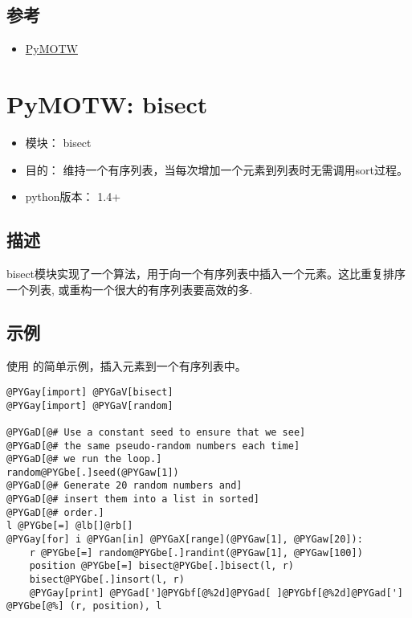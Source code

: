\documentclass[a4paper,10pt,english]{manual}
\begin{document}
\section{参考}
\begin{itemize}
\item {} 
\href{http://http://tc-nsop-test2.tc.baidu.com:3129/documents}{PyMOTW}

\end{itemize}

\resetcurrentobjects


\chapter{PyMOTW: bisect}
\begin{itemize}
\item {} 
模块： bisect

\item {} 
目的： 维持一个有序列表，当每次增加一个元素到列表时无需调用sort过程。

\item {} 
python版本： 1.4+

\end{itemize}


\section{描述}

bisect模块实现了一个算法，用于向一个有序列表中插入一个元素。这比重复排序一个列表, 或重构一个很大的有序列表要高效的多.


\section{示例}

使用  的简单示例，插入元素到一个有序列表中。

\begin{Verbatim}[commandchars=@\[\]]
@PYGay[import] @PYGaV[bisect]
@PYGay[import] @PYGaV[random]

@PYGaD[@# Use a constant seed to ensure that we see]
@PYGaD[@# the same pseudo-random numbers each time]
@PYGaD[@# we run the loop.]
random@PYGbe[.]seed(@PYGaw[1])
@PYGaD[@# Generate 20 random numbers and]
@PYGaD[@# insert them into a list in sorted]
@PYGaD[@# order.]
l @PYGbe[=] @lb[]@rb[]
@PYGay[for] i @PYGan[in] @PYGaX[range](@PYGaw[1], @PYGaw[20]):
    r @PYGbe[=] random@PYGbe[.]randint(@PYGaw[1], @PYGaw[100])
    position @PYGbe[=] bisect@PYGbe[.]bisect(l, r)
    bisect@PYGbe[.]insort(l, r)
    @PYGay[print] @PYGad[']@PYGbf[@%2d]@PYGad[ ]@PYGbf[@%2d]@PYGad['] @PYGbe[@%] (r, position), l
\end{Verbatim}
\end{document}
